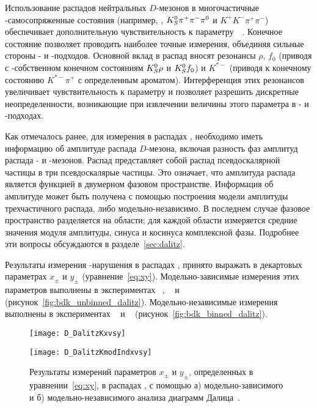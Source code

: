 Использование распадов нейтральных $D$-мезонов в многочастичные \cpconj-самосопряженные состояния (например, \kspp, $K_S^0\pi^+\pi^-\pi^0$ и $K^+K^-\pi^+\pi^-$) обеспечивает дополнительную чувствительность к параметру~\gphi~\cite{bondar,GGSZ}.  Конечное состояние \kspp позволяет проводить наиболее точные измерения, объединяя сильные стороны \glw- и \ads-подходов.  Основной вклад в распад \dnkpp вносят резонансы $\rho$, $f_0$ (приводя с \cpconj-собственном конечном состояниям $K_S^0\rho$ и $K_S^0 f_0$) и $K^{*-}$ (приводя к конечному состоянию $K^{*-}\pi^+$ с определенным ароматом).  Интерференция этих резонансов увеличивает чувствительность к параметру \gphi и позволяет разрешить дискретные неопределенности, возникающие при извлечении величины этого параметра в \glw- и \ads-подходах.  

Как отмечалось ранее, для измерения \gphi в распадах \bdk, \dkpp необходимо иметь информацию об амплитуде распада $D$-мезона, включая разность фаз амплитуд распада \dn- и \dnbar-мезонов.  Распад \dnkpp представляет собой распад псевдоскалярной частицы в три псевдоскалярые частицы.  Это означает, что амплитуда распада является функцией в двумерном фазовом пространстве.  Информация об амплитуде может быть получена с помощью построения модели амплитуды трехчастичного распада, либо модельно-независимо.  В последнем случае фазовое пространство разделяется на области; для каждой области измеряется средние значения модуля амплитуды, синуса и косинуса комплексной фазы.  Подробнее эти вопросы обсуждаются в разделе~\ref{sec:dalitz}.

Результаты измерения \cpconj-нарушения в распадах \bdk, \dkpp принято выражать в декартовых параметрах $x_{\pm}$ и $y_{\pm}$ (уравнение~\eqref{eq:xy}).  Модельно-зависимые измерения этих параметров выполнены в экспериментах \babar~\cite{babar_gamma_dalitz_model}, \belle~\cite{belle_gamma_dalitz_model} и \lhcb~\cite{lhcb_gamma_dalitz_model} (рисунок~\ref{fig:bdk_unbinned_dalitz}).  Модельно-независимые измерения выполнены в экспериментах \belle~\cite{belle_gamma_binned_dalitz} и \lhcb~\cite{lhcb_gamma_binned_dalitz} (рисунок~\ref{fig:bdk_binned_dalitz}).

\begin{figure}[htb]
\begin{minipage}[b]{0.5\textwidth}
 \centering
  \texttt{[image: D\_DalitzKxvsy]}
 \subcaption{}
 \label{fig:bdk_unbinned_dalitz}
\end{minipage}
\begin{minipage}[b]{0.5\textwidth}
 \centering
  \texttt{[image: D\_DalitzKmodIndxvsy]}
 \subcaption{}
 \label{fig:bdk_binned_dalitz}
\end{minipage}
 \caption{Результаты измерений параметров $x_{\pm}$ и $y_{\pm}$, определенных в уравнении~\eqref{eq:xy}, в распадах \bdk, \dkpp с помощью а) модельно-зависимого и б) модельно-независимого анализа диаграмм Далица~\cite{hfag}.}
 \label{fig:bdk_dalitz}
\end{figure}


